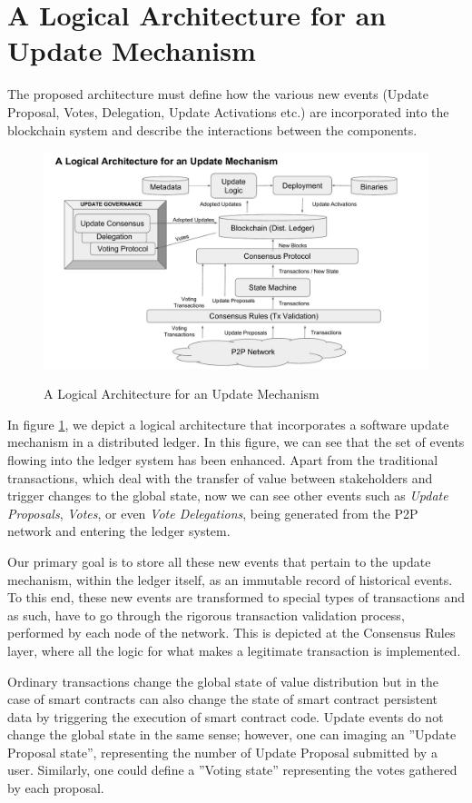 \section{A Logical Architecture for an Update Mechanism}
The proposed architecture must define how the various new events (Update Proposal, Votes, Delegation, Update Activations etc.) are incorporated into the blockchain system and describe the interactions between the components.

\begin{figure}[H]
    \caption{A Logical Architecture for an Update Mechanism}
    \centering
    \includegraphics[width=0.9 \columnwidth,keepaspectratio]{figures/logical_architecture.pdf}
    \label{logarch}
\end{figure}

In figure \ref{logarch}, we depict a logical architecture that incorporates a software update mechanism in a distributed ledger. In this figure, we can see that the set of events flowing into the ledger system has been enhanced. Apart from the traditional transactions, which deal with the transfer of value between stakeholders and trigger changes to the global state, now we can see other events such as \emph{Update Proposals}, \emph{Votes}, or even \emph{Vote Delegations}, being generated from the P2P network and entering the ledger system.

Our primary goal is to store all these new events that pertain to the update mechanism, within the ledger itself, as an immutable record of historical events. To this end, these new events are transformed to special types of transactions and as such, have to go through the rigorous transaction validation process, performed by each node of the network. This is depicted at the Consensus Rules layer, where all the logic for what makes a legitimate transaction is implemented.

Ordinary transactions change the global state of value distribution but in the case of smart contracts can also change the state of smart contract persistent data by triggering the execution of smart contract code. Update events do not change the global state in the same sense; however, one can imaging an ''Update Proposal state'', representing the number of Update Proposal submitted by a user. Similarly, one could define a ''Voting state'' representing the votes gathered by each proposal.


